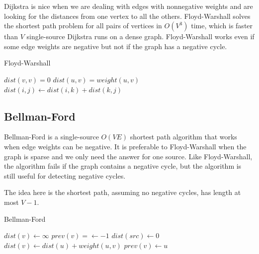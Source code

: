 \documentclass[11pt]{book}
\begin{document}
Dijkstra is nice when we are dealing with edges with nonnegative weights and are looking for the distances from one vertex to all the others. Floyd-Warshall solves the shortest path problem for all pairs of vertices in $O(V^3)$ time, which is faster than $V$ single-source Dijkstra runs on a dense graph. Floyd-Warshall works even if some edge weights are negative but not if the graph has a negative cycle.

\begin{algorithm}[H]
\caption{Floyd-Warshall}
\begin{algorithmic}
	\State $dist(v,v)=0$
\EndFor
{}
	\State $dist(u,v)=weight(u,v)$
\EndFor
{}
            	\State $dist(i,j) \gets dist(i,k)+dist(k,j)$
            \EndIf
        \EndFor
    \EndFor
\EndFor
\end{algorithmic}
\end{algorithm}

\subsection{Bellman-Ford}

Bellman-Ford is a single-source $O(VE)$ shortest path algorithm that works when edge weights can be negative. It is preferable to Floyd-Warshall when the graph is sparse and we only need the answer for one source. Like Floyd-Warshall, the algorithm fails if the graph contains a negative cycle, but the algorithm is still useful for detecting negative cycles.

The idea here is the shortest path, assuming no negative cycles, has length at most $V-1$.

\begin{algorithm}[H]
\caption{Bellman-Ford}
\begin{algorithmic}
	\State $dist(v)\gets\infty$
    \State $prev(v)=\gets -1$
\EndFor
\State $dist(src) \gets 0$
    	    \State $dist(v) \gets dist(u)+weight(u,v)$
	        \State $prev(v) \gets u$
        \EndIf
	\EndFor
\EndFor
{}
	\EndIf
\EndFor
\end{algorithmic}
\end{algorithm}
\end{document}
